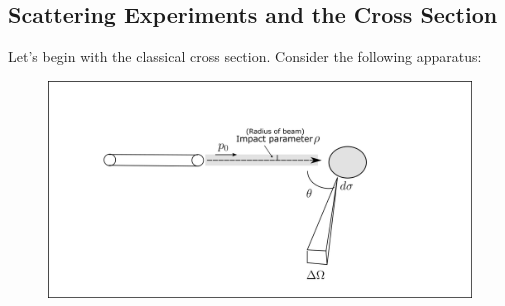 \documentclass{article}
\begin{document}
\subsection{Scattering Experiments and the Cross Section}
Let's begin with the classical cross section. Consider the following apparatus:
\begin{figure}[ht]
    \centering
    \includegraphics[width=\linewidth]{Figures/scattering.png}
    \caption*{}
    \label{fig:scattering}
\end{figure}
\end{document}
